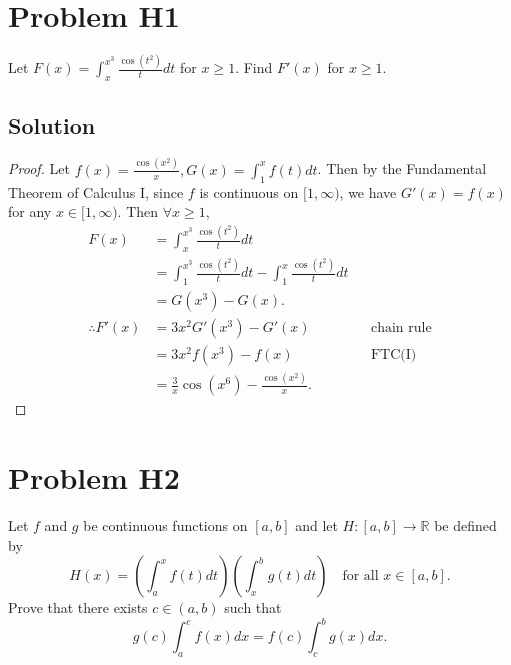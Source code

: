 \documentclass{article}
\title{\mytitle}
\author{\myname}
\date{\today}
\theoremstyle{plain}
\newcommand{\R}{\mathbb{R}}
\newcommand{\bigint}{\displaystyle\int}
\begin{document}
\maketitle
\section*{Problem H1}
Let $F(x)=\bigint_{x}^{x^{3}}\frac{\cos(t^{2})}{t}dt$ for $x\ge 1$. Find $F'(x)$ for $x\ge 1$.
\subsection*{Solution}
\begin{proof}
Let $f(x)=\displaystyle\frac{\cos(x^{2})}{x}, G(x)=\bigint_{1}^{x}f(t)dt$. Then
by the Fundamental Theorem of Calculus I, since $f$ is continuous on $[1,\infty)$, we
have $G'(x)=f(x)$ for any $x\in[1,\infty)$. Then $\forall x\ge 1$,
\begin{align*}
F(x)&=\bigint_{x}^{x^{3}}\frac{\cos(t^{2})}{t}dt\\
&=\bigint_{1}^{x^{3}}\frac{\cos(t^{2})}{t}dt - \bigint_{1}^{x}\frac{\cos(t^{2})}{t}dt\\
&=G(x^{3})-G(x).\\
  \therefore F'(x)&=3x^{2}G'(x^{3})-G'(x) &&\text{chain rule}\\
  &=3x^{2}f(x^{3})-f(x) &&\text{FTC(I)}\\
  &=\frac{3}{x}\cos(x^{6})-\frac{\cos(x^{2})}{x}.
\end{align*}
\end{proof}

\section*{Problem H2}
Let $f$ and $g$ be continuous functions on $[a,b]$ and let $H:[a,b]\to\R$ be
defined
by \[H(x)=\left(\int_{a}^{x}f(t)dt\right)\left(\int_{x}^{b}g(t)dt\right)\quad\text{for all
  } x\in[a,b].\]
Prove that there exists $c\in(a,b)$ such that
\[g(c)\int_{a}^{c}f(x)dx=f(c)\int_{c}^{b}g(x)dx.\]
\end{document}
